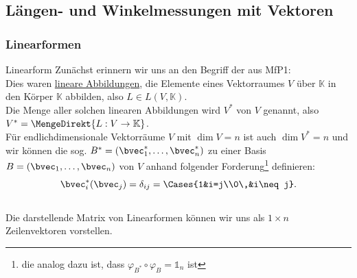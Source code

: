 \subsection{Längen- und Winkelmessungen mit Vektoren}


\subsubsection{Linearformen}
\begin{Wiederholung}
{Linearform}
Zunächst erinnern wir uns an den Begriff der  aus MfP1:\\
Dies waren \underline{lineare Abbildungen}, die Elemente eines Vektorraumes $V$ über $\mathbb{K}$ in den Körper $\mathbb{K}$ abbilden, also $L\in L(V,\mathbb{K})$.\\
Die Menge aller solchen linearen Abbildungen wird  $V^*$ von $V$ genannt, also $V^*=\MengeDirekt{L:V\to\mathbb{K}}$.\\
Für endlichdimensionale Vektorräume $V$ mit $\dim V=n$ ist auch $\dim V^*=n$ und wir können die sog.  $B^*=(\bvec_1^*,\ldots,\bvec_n^*)$ zu einer Basis $B=(\bvec_1,\ldots,\bvec_n)$ von $V$ anhand folgender Forderung\footnote{die analog dazu ist, dass $\varphi_{B^*}\circ\varphi_B=\mathds{1}_n$ ist} definieren:
\begin{equation}
    \bvec_i^*(\bvec_j)=\delta_{ij}=\Cases{1&i=j\\0\,&i\neq j}.
\end{equation}
\\
Die darstellende Matrix von Linearformen können wir uns als $1\times n$ Zeilenvektoren vorstellen.
\end{Wiederholung}
